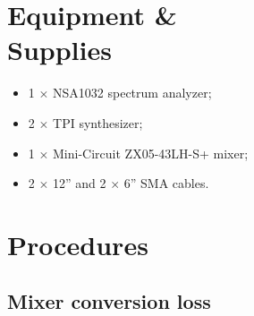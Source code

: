 \documentclass[letterpaper, 11pt]{article}
\begin{document}
\section{Equipment \& \\Supplies}

\begin{itemize}[itemsep=0.5ex]
	\item 1 $\times$ NSA1032 spectrum analyzer;
	\item 2 $\times$ TPI synthesizer;
	\item 1 $\times$ Mini-Circuit ZX05-43LH-S+ mixer;
	\item 2 $\times$ 12'' and 2 $\times$ 6'' SMA cables.
\end{itemize}

\section{Procedures}

\subsection{Mixer conversion loss}
\label{sec:mixer_cl}
\end{document}
